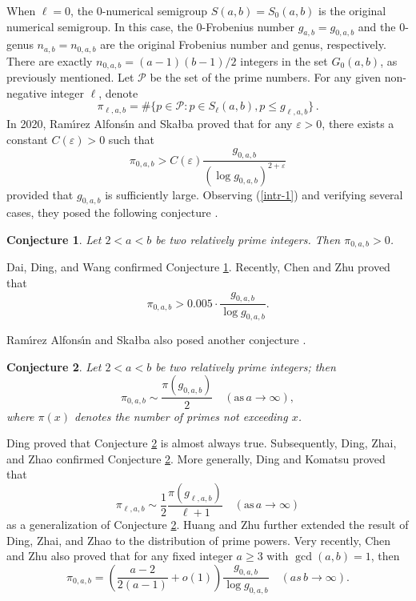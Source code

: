 \documentclass[12pt,a4paper,reqno]{amsart}
\numberwithin{equation}{section}
\theoremstyle{plain}
\newtheorem{conjecture}{Conjecture}
\theoremstyle{definition}
\begin{document}
When $\ell=0$, the $0$-numerical semigroup $S(a,b)=S_0(a,b)$ is the original numerical semigroup. In this case, the $0$-Frobenius number $g_{a,b}=g_{0,a,b}$ and the $0$-genus $n_{a,b}=n_{0,a,b}$ are the original Frobenius number and genus, respectively.  
There are exactly $n_{0,a,b}=(a-1)(b-1)/2$ integers in the set $G_0(a,b)$, as previously mentioned. Let $\mathcal P$ be the set of the prime numbers.  
For any given non-negative integer $\ell$, denote 
$$
\pi_{\ell,a,b}=\#\{p\in\mathcal P: p\in S_{\ell}(a,b), p\leq g_{\ell,a,b}\}\,.  
$$
In 2020,
Ram\'{\i}rez Alfons\'{\i}n and Ska{\l}ba \cite{RS} proved that for any $\varepsilon>0$, there exists a constant $C(\varepsilon)>0$ such that 
\begin{equation}\label{intr-1}
	\pi_{0,a,b}>C(\varepsilon)\frac{g_{0,a,b}}{(\log g_{0,a,b})^{2+\varepsilon}}
\end{equation}
provided that $g_{0,a,b}$ is sufficiently large.
Observing (\ref{intr-1}) and
verifying several cases, they posed the following conjecture \cite[Conjecture 2]{RS}.
\begin{conjecture}\label{con-1}
	Let $2<a<b$ be two relatively prime integers. Then $\pi_{0,a,b}>0$.
\end{conjecture}
Dai, Ding, and Wang \cite{Dai/Ding/Wang} confirmed Conjecture \ref{con-1}. Recently, Chen and Zhu \cite{Chen/Zhu} proved that
\begin{equation*}
	\pi_{0,a,b}>0.005 \cdot \frac{g_{0,a,b}}{\log g_{0,a,b}}.
\end{equation*} 

Ram\'{\i}rez Alfons\'{\i}n and Ska{\l}ba also posed another conjecture \cite[Conjecture 3]{RS}.
\begin{conjecture}\label{con-2}
	Let $2<a<b$ be two relatively prime integers; then
	$$
	\pi_{0,a,b}\sim \frac{\pi(g_{0,a,b})}{2} \quad (\text{as}\, a\to \infty),
	$$
	where $\pi(x)$ denotes the number of primes not exceeding $x$.
\end{conjecture}

 Ding \cite{Ding} proved that Conjecture \ref{con-2} is almost always true. Subsequently, 
 Ding, Zhai, and Zhao \cite{Ding/Zhai/Zhao} confirmed Conjecture \ref{con-2}. More generally, Ding and Komatsu \cite{Ding/Komatsu} proved that 
\begin{equation}\label{intr-Ding/Komatsu-1}
	\pi_{\ell,a,b}\sim \frac{1}{2} \frac{\pi(g_{\ell,a,b})}{\ell+1} \quad (\text{as}\, a\to \infty )
\end{equation}
as a generalization of Conjecture \ref{con-2}. Huang and Zhu \cite{Huang/Zhu} further extended the result of Ding, Zhai, and Zhao to the distribution of prime powers. Very recently, Chen and Zhu \cite{Chen/Zhu} also proved that for any fixed integer $a\geq 3$ with $\gcd(a,b)=1$, then
\begin{equation*}
	\pi_{0,a,b}=\left(\frac{a-2}{2(a-1)}+o(1) \right)\frac{g_{0,a,b}}{\log g_{0,a,b}} \quad (as \,b\to \infty).
\end{equation*}
\end{document}
